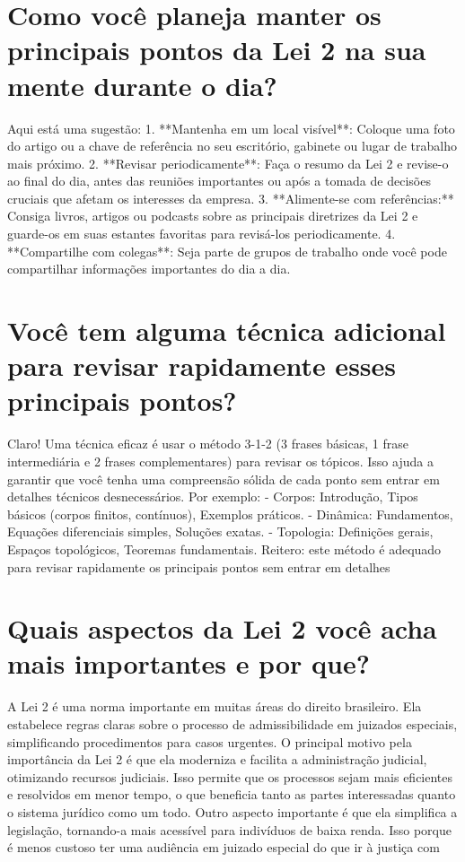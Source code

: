 \documentclass[11pt,a4paper]{article}
\begin{document}
\section{Como você planeja manter os principais pontos da Lei 2 na sua mente durante o dia?}
Aqui está uma sugestão: 1. **Mantenha em um local visível**: Coloque uma foto do artigo ou a chave de referência no seu escritório, gabinete ou lugar de trabalho mais próximo. 2. **Revisar periodicamente**: Faça o resumo da Lei 2 e revise-o ao final do dia, antes das reuniões importantes ou após a tomada de decisões cruciais que afetam os interesses da empresa. 3. **Alimente-se com referências:** Consiga livros, artigos ou podcasts sobre as principais diretrizes da Lei 2 e guarde-os em suas estantes favoritas para revisá-los periodicamente. 4. **Compartilhe com colegas**: Seja parte de grupos de trabalho onde você pode compartilhar informações importantes do dia a dia.

\section{Você tem alguma técnica adicional para revisar rapidamente esses principais pontos?}
Claro! Uma técnica eficaz é usar o método 3-1-2 (3 frases básicas, 1 frase intermediária e 2 frases complementares) para revisar os tópicos. Isso ajuda a garantir que você tenha uma compreensão sólida de cada ponto sem entrar em detalhes técnicos desnecessários. Por exemplo: - Corpos: Introdução, Tipos básicos (corpos finitos, contínuos), Exemplos práticos. - Dinâmica: Fundamentos, Equações diferenciais simples, Soluções exatas. - Topologia: Definições gerais, Espaços topológicos, Teoremas fundamentais. Reitero: este método é adequado para revisar rapidamente os principais pontos sem entrar em detalhes

\section{Quais aspectos da Lei 2 você acha mais importantes e por que?}
A Lei 2 é uma norma importante em muitas áreas do direito brasileiro. Ela estabelece regras claras sobre o processo de admissibilidade em juizados especiais, simplificando procedimentos para casos urgentes. O principal motivo pela importância da Lei 2 é que ela moderniza e facilita a administração judicial, otimizando recursos judiciais. Isso permite que os processos sejam mais eficientes e resolvidos em menor tempo, o que beneficia tanto as partes interessadas quanto o sistema jurídico como um todo. Outro aspecto importante é que ela simplifica a legislação, tornando-a mais acessível para indivíduos de baixa renda. Isso porque é menos custoso ter uma audiência em juizado especial do que ir à justiça com
\end{document}
